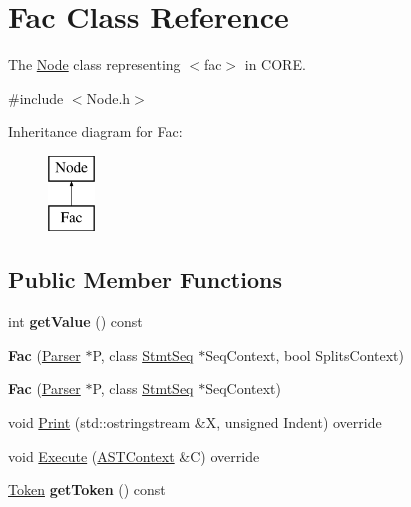 \hypertarget{class_fac}{}\section{Fac Class Reference}
\label{class_fac}


The \mbox{\hyperlink{class_node}{Node}} class representing {\ttfamily $<$fac$>$} in C\+O\+RE.  




{\ttfamily \#include $<$Node.\+h$>$}

Inheritance diagram for Fac\+:\begin{figure}[H]
\begin{center}
\leavevmode
\includegraphics[height=2.000000cm]{class_fac}
\end{center}
\end{figure}
\subsection*{Public Member Functions}
\begin{DoxyCompactItemize}
\item 
\mbox{\label{class_fac_a0b370b278ac6f2830da14e7fb6fb15c4}} 
int {\bfseries get\+Value} () const
\item 
\mbox{\label{class_fac_aa29314863b7653d6152fbdb6ee768adf}} 
{\bfseries Fac} (\mbox{\hyperlink{class_parser}{Parser}} $\ast$P, class \mbox{\hyperlink{class_stmt_seq}{Stmt\+Seq}} $\ast$Seq\+Context, bool Splits\+Context)
\item 
\mbox{\label{class_fac_a15c287ee03124abc02bd6aa21b95e1a0}} 
{\bfseries Fac} (\mbox{\hyperlink{class_parser}{Parser}} $\ast$P, class \mbox{\hyperlink{class_stmt_seq}{Stmt\+Seq}} $\ast$Seq\+Context)
\item 
void \mbox{\hyperlink{class_fac_abf645b3e9acdc88dd83ed3dacf981c58}{Print}} (std\+::ostringstream \&X, unsigned Indent) override
\item 
void \mbox{\hyperlink{class_fac_a9448c1c51e8f79edce0ac7c7cda21c58}{Execute}} (\mbox{\hyperlink{class_a_s_t_context}{A\+S\+T\+Context}} \&C) override
\item 
\mbox{\label{class_fac_a89db7c42cf5302bd8aaf07dc299ef1fd}} 
\mbox{\hyperlink{class_token}{Token}} {\bfseries get\+Token} () const
\end{DoxyCompactItemize}
